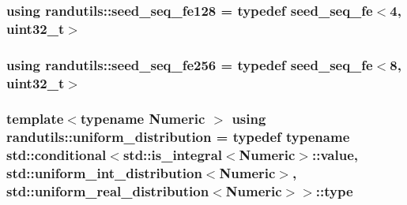 \subsubsection[{seed\+\_\+seq\+\_\+fe128}]{\setlength{\rightskip}{0pt plus 5cm}using {\bf randutils\+::seed\+\_\+seq\+\_\+fe128} = typedef {\bf seed\+\_\+seq\+\_\+fe}$<$4, uint32\+\_\+t$>$}\label{namespacerandutils_a2b7c80226592f2cfc2dd51ef1b6a6648}
\hypertarget{namespacerandutils_ab264470d8fc7505e72c78a33528108bd}{}
\subsubsection[{seed\+\_\+seq\+\_\+fe256}]{\setlength{\rightskip}{0pt plus 5cm}using {\bf randutils\+::seed\+\_\+seq\+\_\+fe256} = typedef {\bf seed\+\_\+seq\+\_\+fe}$<$8, uint32\+\_\+t$>$}\label{namespacerandutils_ab264470d8fc7505e72c78a33528108bd}
\hypertarget{namespacerandutils_ad441b52b9359829bc0e396b1eb484953}{}
\subsubsection[{uniform\+\_\+distribution}]{\setlength{\rightskip}{0pt plus 5cm}template$<$typename Numeric $>$ using {\bf randutils\+::uniform\+\_\+distribution} = typedef typename std\+::conditional$<$std\+::is\+\_\+integral$<$Numeric$>$\+::value, std\+::uniform\+\_\+int\+\_\+distribution$<$Numeric$>$, std\+::uniform\+\_\+real\+\_\+distribution$<$Numeric$>$$>$\+::type}\label{namespacerandutils_ad441b52b9359829bc0e396b1eb484953}
